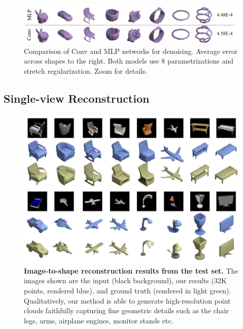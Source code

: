 \begin{figure}[ht!]
    \centering
    \includegraphics[width=1.0\linewidth]{dmp/imgs/conv_denoising.pdf}
    \caption{\label{fig:rebuttal}\small
    Comparison of Conv and MLP networks for denoising.
    Average error across shapes to the right. Both models use 8
    parametrizations and stretch regularization. Zoom for details.
    }
\end{figure}


\subsection{Single-view Reconstruction}

\begin{figure}[t]
\centering
\includegraphics[width=0.9\linewidth]{dmp/imgs/data.pdf}
	\caption{\label{fig:data} \small
	\textbf{Image-to-shape reconstruction results from the test set.} The images shown are the input (black background), our results (32K points, rendered blue), and ground truth (rendered in light green). Qualitatively, our method is able to generate high-resolution point clouds faithfully capturing fine geometric details such as the chair legs, arms, airplane engines, monitor stands etc.}
	
\end{figure}


